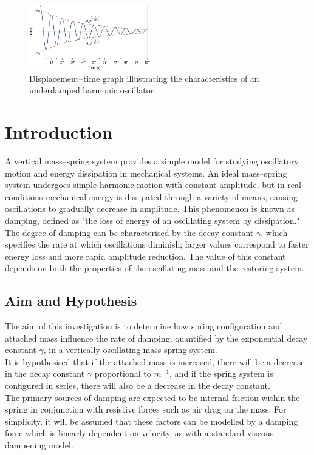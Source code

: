 \begin{figure}
    \centering
    \includegraphics[width=0.47\textwidth]{images/damped_shm.png}
    \caption{Displacement--time graph illustrating the characteristics of an underdamped harmonic oscillator.}
\end{figure}

\section{Introduction}

A vertical mass--spring system provides a simple model for studying oscillatory motion and energy dissipation in mechanical systems. An ideal mass--spring system undergoes simple harmonic motion with constant amplitude, but in real conditions mechanical energy is dissipated through a variety of means, causing oscillations to gradually decrease in amplitude. This phenomenon is known as damping, defined as "the loss of energy of an oscillating system by dissipation." \\
The degree of damping can be characterised by the decay constant $\gamma$, which specifies the rate at which oscillations diminish; larger values correspond to faster energy loss and more rapid amplitude reduction. The value of this constant depends on both the properties of the oscillating mass and the restoring system. \\

\subsection{Aim and Hypothesis}
The aim of this investigation is to determine how spring configuration and attached mass influence the rate of damping, quantified by the exponential decay constant $\gamma$, in a vertically oscillating mass-spring system. \\
It is hypothesised that if the attached mass is increased, there will be a decrease in the decay constant $\gamma$ proportional to $m^{-1}$, and if the spring system is configured in series, there will also be a decrease in the decay constant. \\
The primary sources of damping are expected to be internal friction within the spring in conjunction with resistive forces such as air drag on the mass. For simplicity, it will be assumed that these factors can be modelled by a damping force which is linearly dependent on velocity, as with a standard viscous dampening model. \\


